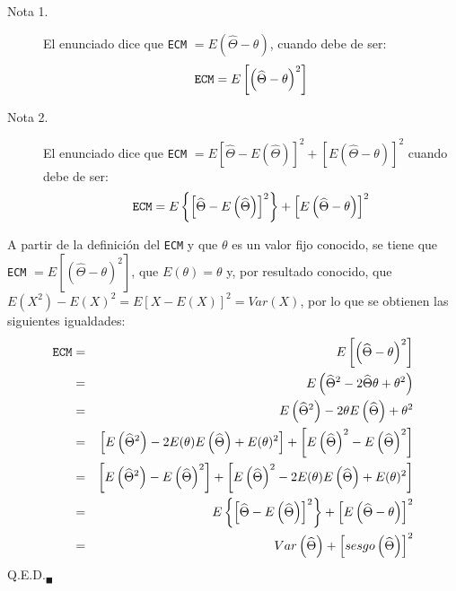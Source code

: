 \begin{solucion}
 $\phantom{0}$
 \begin{description}
  \item[Nota 1.] El enunciado dice que \texttt{ECM} $= E\left( \widehat{\Theta}- \theta \right)$, cuando debe de ser:
  \begin{equation*}
   \text{\texttt{ECM}} = E\left[ \left( \widehat{\Theta}- \theta \right)^2 \right]
  \end{equation*}
  
  \item[Nota 2.] El enunciado dice que \texttt{ECM} $= E\left[ \widehat{\Theta} - E\left( \widehat{\Theta} \right) \right]^2 + \left[ E\left( \widehat{\Theta} - \theta \right) \right]^2$ cuando debe de ser:
  \begin{equation*}
   \text{\texttt{ECM}} = E \left\{ \left[ \widehat{\Theta} - E\left( \widehat{\Theta} \right) \right]^2 \right\} + \left[ E\left( \widehat{\Theta} - \theta \right) \right]^2
  \end{equation*}
 \end{description}

 A partir de la definici\'on del \texttt{ECM} y que $\theta$ es un valor fijo conocido, se tiene que \texttt{ECM} $=E\left[ \left( \widehat{\Theta}- \theta \right)^2 \right]$, que $E(\theta) = \theta$ y, por resultado conocido, que $E\left( X^2 \right) - E(X)^2 = E\left[ X - E(X) \right]^2 = Var(X)$, por lo que se obtienen las siguientes igualdades:
 \begin{eqnarray*}
  \text{\texttt{ECM}} 
  & = & E\left[ \left( \widehat{\Theta}- \theta \right)^2 \right] \\
  & = & E\left( \widehat{\Theta}^2 -2\widehat{\Theta}\theta  + \theta ^2 \right) \\
  & = & E\left( \widehat{\Theta}^2 \right) - 2\theta E \left( \widehat{\Theta} \right) + \theta^2 \\
  & = & \left[ E\left( \widehat{\Theta}^2 \right) - 2E(\theta) E \left( \widehat{\Theta} \right) + E(\theta)^2 \right] + \left[ E\left( \widehat{\Theta} \right)^2 - E\left( \widehat{\Theta} \right)^2 \right] \\
  & = & \left[ E\left( \widehat{\Theta}^2 \right) - E\left( \widehat{\Theta} \right)^2 \right] + \left[ E\left( \widehat{\Theta} \right)^2 - 2E(\theta) E \left( \widehat{\Theta} \right) + E(\theta)^2 \right] \\
  & = & E \left\{ \left[ \widehat{\Theta} - E\left( \widehat{\Theta} \right) \right]^2 \right\} + \left[ E\left( \widehat{\Theta} - \theta \right) \right]^2 \\
  & = & Var\left( \widehat{\Theta} \right) + \left[ sesgo\left( \widehat{\Theta} \right) \right]^2
 \end{eqnarray*}
 Q.E.D.${}_{\blacksquare}$
\end{solucion}
